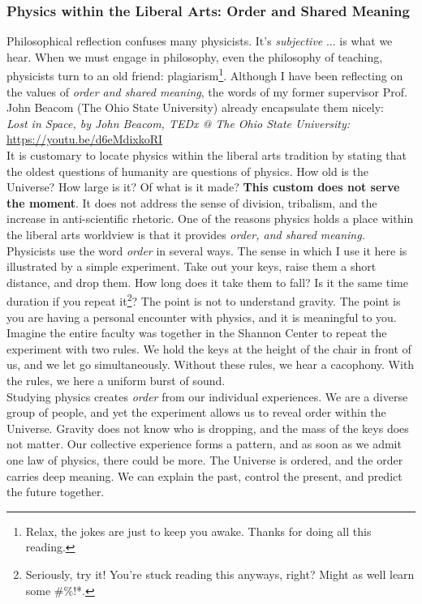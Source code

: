 \documentclass[../../../main.tex]{subfiles}
\begin{document}
\subsubsection{Physics within the Liberal Arts: Order and Shared Meaning}

Philosophical reflection confuses many physicists.  It's \textit{subjective} ... is what we hear.  When we must engage in philosophy, even the philosophy of teaching, physicists turn to an old friend: plagiarism\footnote{Relax, the jokes are just to keep you awake.  Thanks for doing all this reading.}.  Although I have been reflecting on the values of \textit{order and shared meaning}, the words of my former supervisor Prof. John Beacom (The Ohio State University) already encapsulate them nicely:
\\
\vspace{0.15cm}
\textit{Lost in Space, by John Beacom, TEDx @ The Ohio State University:} \url{https://youtu.be/d6eMdixkoRI}
\\
\vspace{0.15cm}
It is customary to locate physics within the liberal arts tradition by stating that the oldest questions of humanity are questions of physics.  How old is the Universe?  How large is it?  Of what is it made?  \textbf{This custom does not serve the moment}.  It does not address the sense of division, tribalism, and the increase in anti-scientific rhetoric.  One of the reasons physics holds a place within the liberal arts worldview is that it provides \textit{order, and shared meaning.}
\\
\vspace{0.15cm}
Physicists use the word \textit{order} in several ways.  The sense in which I use it here is illustrated by a simple experiment.  Take out your keys, raise them a short distance, and drop them.  How long does it take them to fall?  Is it the same time duration if you repeat it\footnote{Seriously, try it!  You're stuck reading this anyways, right?  Might as well learn some \#\%!*.}? The point is not to understand gravity.  The point is you are having a personal encounter with physics, and it is meaningful to you.  Imagine the entire faculty was together in the Shannon Center to repeat the experiment with two rules.  We hold the keys at the height of the chair in front of us, and we let go simultaneously.  Without these rules, we hear a cacophony.  With the rules, we here a uniform burst of sound.
\\
\vspace{0.15cm}
Studying physics creates \textit{order} from our individual experiences.  We are a diverse group of people, and yet the experiment allows us to reveal order within the Universe.  Gravity does not know who is dropping, and the mass of the keys does not matter.  Our collective experience forms a pattern, and as soon as we admit one law of physics, there could be more.  The Universe is ordered, and the order carries deep meaning.  We can explain the past, control the present, and predict the future together.
\end{document}
